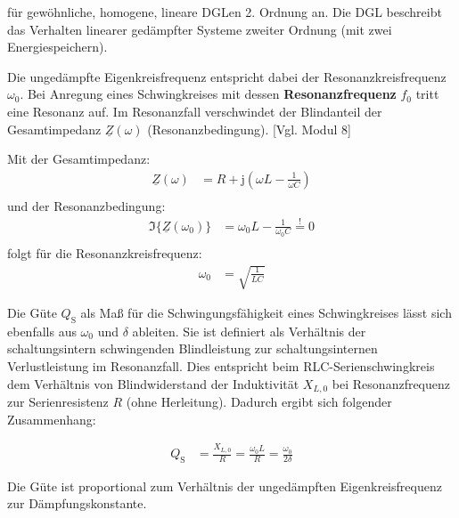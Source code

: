 \begin{frame}[t]
{    für gewöhnliche, homogene, lineare DGLen 2. Ordnung an.
    Die DGL beschreibt das Verhalten linearer gedämpfter Systeme zweiter Ordnung (mit zwei Energiespeichern).%

    Die ungedämpfte Eigenkreisfrequenz entspricht dabei der Resonanzkreisfrequenz $\omega_0$.
    Bei Anregung eines Schwingkreises mit dessen \textbf{Resonanzfrequenz} $f_0$ tritt eine Resonanz auf.
    Im Resonanzfall verschwindet der Blindanteil der Gesamtimpedanz $\underline{Z}(\omega)$ (Resonanzbedingung). [Vgl. Modul 8]

    Mit der Gesamtimpedanz:
    \begin{align}
            \underline{Z}(\omega) &= R + \mathrm{j} \left( \omega L - \frac{1}{\omega C} \right) \nonumber\\
    \end{align}
    und der Resonanzbedingung:
    \begin{align}
            \Im\{\underline{Z}(\omega_0)\} &= \omega_0 L - \frac{1}{\omega_0 C} \overset{!}{=} 0 \nonumber\\
    \end{align}
    folgt für die Resonanzkreisfrequenz:
    \begin{align}
            \omega_0 &= \sqrt{\frac{1}{LC}} \label{eq:dgl:rlc:resonanzkreisfrequenz}
    \end{align}

    Die Güte $Q_{\mathrm{S}}$ als Maß für die Schwingungsfähigkeit eines Schwingkreises lässt sich ebenfalls aus $\omega_0$ und $\delta$ ableiten.
    Sie ist definiert als Verhältnis der schaltungsintern schwingenden Blindleistung
    zur schaltungsinternen Verlustleistung im Resonanzfall. Dies entspricht beim RLC-Serienschwingkreis dem Verhältnis von
    Blindwiderstand der Induktivität $X_{L,0}$ bei Resonanzfrequenz zur Serienresistenz $R$ (ohne Herleitung).
    Dadurch ergibt sich folgender Zusammenhang:

    \begin{align}
        Q_{\mathrm{S}} &= \frac{X_{L,0}}{R} = \frac{\omega_0 L}{R} = \frac{\omega_0}{2\delta} \label{eq:dgl:rlc:guete}
    \end{align}

    Die Güte ist proportional zum Verhältnis der ungedämpften Eigenkreisfrequenz zur Dämpfungskonstante. %

}
\end{frame}
